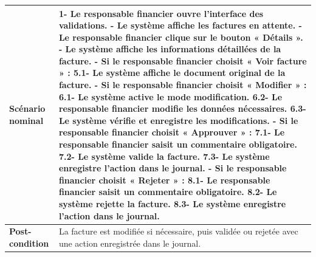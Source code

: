 \begin{table}[H]
\begin{tabularx}{\textwidth}{|p{4.5cm}|X|}
		\textbf{Scénario nominal} &
		1- Le responsable financier ouvre l’interface des validations. \newline
		2- Le système affiche les factures en attente. \newline
		3- Le responsable financier clique sur le bouton « Détails ». \newline
		4- Le système affiche les informations détaillées de la facture. \newline
		5- Si le responsable financier choisit « Voir facture » : \newline
		\hspace*{0.5cm}5.1- Le système affiche le document original de la facture. \newline
		6- Si le responsable financier choisit « Modifier » : \newline
		\hspace*{0.5cm}6.1- Le système active le mode modification. \newline
		\hspace*{0.5cm}6.2- Le responsable financier modifie les données nécessaires. \newline
		\hspace*{0.5cm}6.3- Le système vérifie et enregistre les modifications. \newline
		7- Si le responsable financier choisit « Approuver » : \newline
		\hspace*{0.5cm}7.1- Le responsable financier saisit un commentaire obligatoire. \newline
		\hspace*{0.5cm}7.2- Le système valide la facture. \newline
		\hspace*{0.5cm}7.3- Le système enregistre l’action dans le journal. \newline
		8- Si le responsable financier choisit « Rejeter » : \newline
		\hspace*{0.5cm}8.1- Le responsable financier saisit un commentaire obligatoire. \newline
		\hspace*{0.5cm}8.2- Le système rejette la facture. \newline
		\hspace*{0.5cm}8.3- Le système enregistre l’action dans le journal. \\ \hline
		
		\textbf{Post-condition} & La facture est modifiée si nécessaire, puis validée ou rejetée avec une action enregistrée dans le journal. \\ \hline
		

\end{tabularx}
\end{table}
